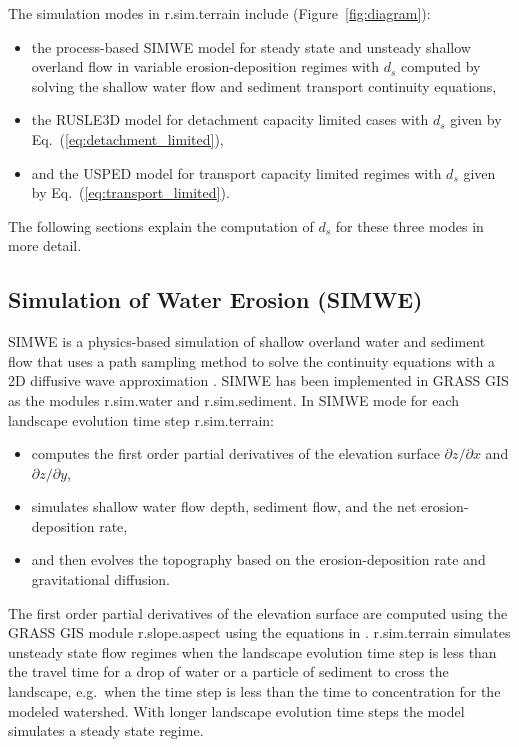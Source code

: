 \documentclass[gmd, manuscript]{copernicus}
\begin{document}
The simulation modes in r.sim.terrain include (Figure~\ref{fig:diagram}):
\begin{itemize}
  \item the process-based SIMWE model 
  for steady state and unsteady shallow overland flow 
  in variable erosion-deposition regimes
  with $d_s$ computed by solving the shallow water flow 
  and sediment transport continuity equations,
  \item the RUSLE3D model for detachment capacity limited cases
  with $d_s$ given by Eq.~(\ref{eq:detachment_limited}),
  \item and the USPED model for transport capacity limited regimes
  with $d_s$ given by Eq.~(\ref{eq:transport_limited}).
\end{itemize}

\noindent The following sections explain the computation of $d_s$ for these three modes in more detail.

\subsection{Simulation of Water Erosion (SIMWE)} \label{simwe}
SIMWE is a physics-based simulation of shallow overland water and sediment flow
that uses a path sampling method to solve the continuity equations 
with a 2D diffusive wave approximation 
\citep{Mitas1998,Mitasova2004}.
SIMWE has been implemented in GRASS GIS as the modules 
r.sim.water
and r.sim.sediment. 
In SIMWE mode for each landscape evolution time step
r.sim.terrain:
\begin{itemize}
\item computes the first order partial derivatives of the elevation surface
$\partial z / \partial x$ and $\partial z / \partial y$,
\item simulates shallow water flow depth, sediment flow, and the net erosion-deposition rate, 
\item and then evolves the topography based on the erosion-deposition rate and gravitational diffusion. 
\end{itemize}
%
The first order partial derivatives of the elevation surface
are computed using the GRASS GIS module r.slope.aspect 
using the equations in \citet{Hofierka2009}.
r.sim.terrain simulates unsteady state flow regimes
when the landscape evolution time step is less than the travel time 
for a drop of water or a particle of sediment to cross the landscape,
e.g.~when the time step is less than the 
time to concentration for the modeled watershed.
With longer landscape evolution time steps 
the model simulates a steady state regime. 
\end{document}
